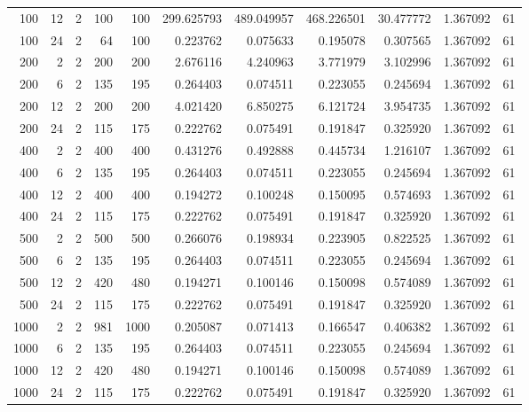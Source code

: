 \begin{table}
\begin{tabular}{rrrrrrrrrrr}
100 & 12 & 2 & 100 & 100 & 299.625793 & 489.049957 & 468.226501 & 30.477772 & 1.367092 & 61 \\
100 & 24 & 2 & 64 & 100 & 0.223762 & 0.075633 & 0.195078 & 0.307565 & 1.367092 & 61 \\
200 & 2 & 2 & 200 & 200 & 2.676116 & 4.240963 & 3.771979 & 3.102996 & 1.367092 & 61 \\
200 & 6 & 2 & 135 & 195 & 0.264403 & 0.074511 & 0.223055 & 0.245694 & 1.367092 & 61 \\
200 & 12 & 2 & 200 & 200 & 4.021420 & 6.850275 & 6.121724 & 3.954735 & 1.367092 & 61 \\
200 & 24 & 2 & 115 & 175 & 0.222762 & 0.075491 & 0.191847 & 0.325920 & 1.367092 & 61 \\
400 & 2 & 2 & 400 & 400 & 0.431276 & 0.492888 & 0.445734 & 1.216107 & 1.367092 & 61 \\
400 & 6 & 2 & 135 & 195 & 0.264403 & 0.074511 & 0.223055 & 0.245694 & 1.367092 & 61 \\
400 & 12 & 2 & 400 & 400 & 0.194272 & 0.100248 & 0.150095 & 0.574693 & 1.367092 & 61 \\
400 & 24 & 2 & 115 & 175 & 0.222762 & 0.075491 & 0.191847 & 0.325920 & 1.367092 & 61 \\
500 & 2 & 2 & 500 & 500 & 0.266076 & 0.198934 & 0.223905 & 0.822525 & 1.367092 & 61 \\
500 & 6 & 2 & 135 & 195 & 0.264403 & 0.074511 & 0.223055 & 0.245694 & 1.367092 & 61 \\
500 & 12 & 2 & 420 & 480 & 0.194271 & 0.100146 & 0.150098 & 0.574089 & 1.367092 & 61 \\
500 & 24 & 2 & 115 & 175 & 0.222762 & 0.075491 & 0.191847 & 0.325920 & 1.367092 & 61 \\
1000 & 2 & 2 & 981 & 1000 & 0.205087 & 0.071413 & 0.166547 & 0.406382 & 1.367092 & 61 \\
1000 & 6 & 2 & 135 & 195 & 0.264403 & 0.074511 & 0.223055 & 0.245694 & 1.367092 & 61 \\
1000 & 12 & 2 & 420 & 480 & 0.194271 & 0.100146 & 0.150098 & 0.574089 & 1.367092 & 61 \\
1000 & 24 & 2 & 115 & 175 & 0.222762 & 0.075491 & 0.191847 & 0.325920 & 1.367092 & 61 \\
\bottomrule
\end{tabular}
\end{table}

